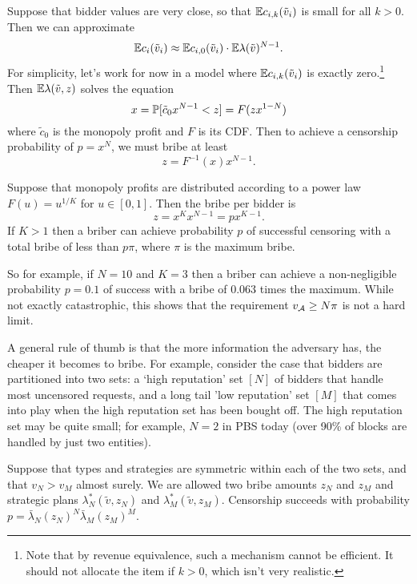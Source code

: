 \begin{example}

  Suppose that bidder values are very close, so that $\mathbb{E} c_{i,k}(\tilde v_i)$ is small for all $k>0$.
  Then we can approximate
  \[
    \mathbb{E} c_i(\tilde v_i) \approx \mathbb{E} c_{i,0}(\tilde v_i) \cdot \mathbb{E} \lambda(\tilde v)^{N-1}.
  \]
  For simplicity, let's work for now in a model where $\mathbb{E} c_{i,k}(\tilde v_i)$ is exactly zero.\footnote{Note that by revenue equivalence, such a mechanism cannot be efficient. It should not allocate the item if $k>0$, which isn't very realistic.}
  Then $\mathbb{E}\lambda(\tilde v,z)$ solves the equation
  \[
    x = \mathbb{P}[\tilde{c}_0x^{N-1} < z] = F(zx^{1-N})
  \]
  where $\tilde{c}_0$ is the monopoly profit and $F$ is its CDF.
  Then to achieve a censorship probability of $p=x^N$, we must bribe at least
  \[
    z = F^{-1}(x)x^{N-1}.
  \]
  
  Suppose that monopoly profits are distributed according to a power law $F(u) = u^{1/K}$ for $u\in[0,1]$.
  Then the bribe per bidder is
  \[
    z = x^Kx^{N-1} = px^{K-1}.
  \]
  If $K>1$ then a briber can achieve probability $p$ of successful censoring with a total bribe of less than $p\pi$, where $\pi$ is the maximum bribe.
  
  So for example, if $N=10$ and $K=3$ then a briber can achieve a non-negligible probability $p=0.1$ of success with a bribe of $0.063$ times the maximum.
  While not exactly catastrophic, this shows that the requirement $v_{\mathcal{A}}\geq N\pi$ is not a hard limit.

\end{example}

\begin{example}

  A general rule of thumb is that the more information the adversary has, the cheaper it becomes to bribe.
  For example, consider the case that bidders are partitioned into two sets: a `high reputation' set $[N]$ of bidders that handle most uncensored requests, and a long tail 'low reputation' set $[M]$ that comes into play when the high reputation set has been bought off.
  The high reputation set may be quite small; for example, $N=2$ in PBS today (over 90\% of blocks are handled by just two entities).

  Suppose that types and strategies are symmetric within each of the two sets, and that $v_N>v_M$ almost surely. 
  We are allowed two bribe amounts $z_N$ and $z_M$ and strategic plans $\lambda_N^*(\tilde{v},z_N)$ and $\lambda_M^*(\tilde{v},z_M)$.
  Censorship succeeds with probability $p=\bar\lambda_N(z_N)^N\bar\lambda_M(z_M)^M$.


\end{example}

